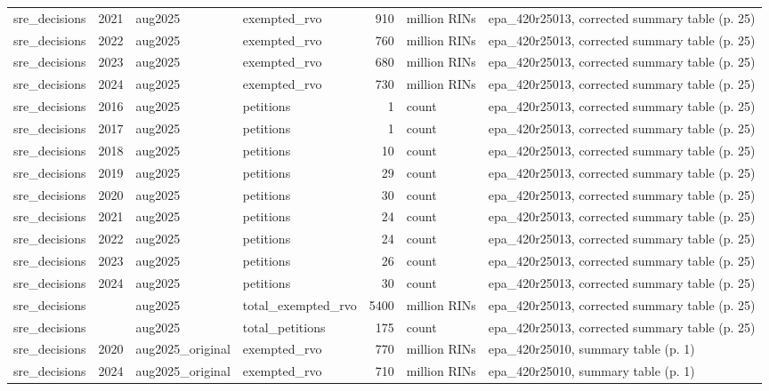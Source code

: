 \begin{longtable}{p{2.3cm}p{0.7cm}p{1.0cm}p{2.6cm}rp{1.7cm}p{4.6cm}}
sre\_decisions & 2021 & aug2025 & exempted\_rvo & 910 & million RINs & epa\_420r25013, corrected summary table (p. 25) \\
sre\_decisions & 2022 & aug2025 & exempted\_rvo & 760 & million RINs & epa\_420r25013, corrected summary table (p. 25) \\
sre\_decisions & 2023 & aug2025 & exempted\_rvo & 680 & million RINs & epa\_420r25013, corrected summary table (p. 25) \\
sre\_decisions & 2024 & aug2025 & exempted\_rvo & 730 & million RINs & epa\_420r25013, corrected summary table (p. 25) \\
sre\_decisions & 2016 & aug2025 & petitions & 1 & count & epa\_420r25013, corrected summary table (p. 25) \\
sre\_decisions & 2017 & aug2025 & petitions & 1 & count & epa\_420r25013, corrected summary table (p. 25) \\
sre\_decisions & 2018 & aug2025 & petitions & 10 & count & epa\_420r25013, corrected summary table (p. 25) \\
sre\_decisions & 2019 & aug2025 & petitions & 29 & count & epa\_420r25013, corrected summary table (p. 25) \\
sre\_decisions & 2020 & aug2025 & petitions & 30 & count & epa\_420r25013, corrected summary table (p. 25) \\
sre\_decisions & 2021 & aug2025 & petitions & 24 & count & epa\_420r25013, corrected summary table (p. 25) \\
sre\_decisions & 2022 & aug2025 & petitions & 24 & count & epa\_420r25013, corrected summary table (p. 25) \\
sre\_decisions & 2023 & aug2025 & petitions & 26 & count & epa\_420r25013, corrected summary table (p. 25) \\
sre\_decisions & 2024 & aug2025 & petitions & 30 & count & epa\_420r25013, corrected summary table (p. 25) \\
sre\_decisions &  & aug2025 & total\_exempted\_rvo & 5400 & million RINs & epa\_420r25013, corrected summary table (p. 25) \\
sre\_decisions &  & aug2025 & total\_petitions & 175 & count & epa\_420r25013, corrected summary table (p. 25) \\
sre\_decisions & 2020 & aug2025\_original & exempted\_rvo & 770 & million RINs & epa\_420r25010, summary table (p. 1) \\
sre\_decisions & 2024 & aug2025\_original & exempted\_rvo & 710 & million RINs & epa\_420r25010, summary table (p. 1) \\

\end{longtable}
